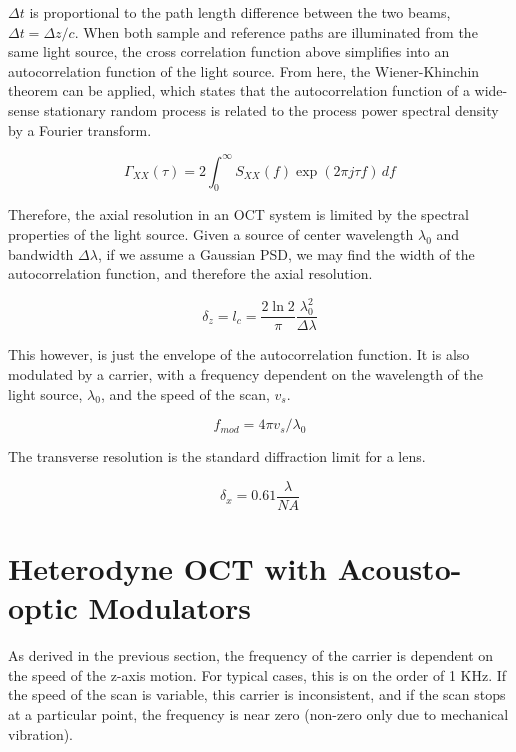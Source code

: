 $\Delta t$ is proportional to the path length difference between the two beams, $\Delta t = \Delta z / c$. When both sample and reference paths are illuminated from the same light source, the cross correlation function above simplifies into an autocorrelation function of the light source. From here, the Wiener-Khinchin theorem can be applied, which states that the autocorrelation function of a wide-sense stationary random process is related to the process power spectral density by a Fourier transform.

\begin{equation}
\Gamma_{XX}(\tau) = 2 \int_{0}^\infty S_{XX}(f) \exp(2 \pi j \tau f) \,df
\end{equation}

Therefore, the axial resolution in an OCT system is limited by the spectral properties of the light source. Given a source of center wavelength $\lambda_0$ and bandwidth $\Delta \lambda$, if we assume a Gaussian PSD, we may find the width of the autocorrelation function, and therefore the axial resolution. \cite{fercher}

\begin{equation} \label{eq:ares}
\delta_z = l_c = \frac{2 \ln{2}}{\pi} \frac{\lambda_0^2}{\Delta \lambda}
\end{equation}

This however, is just the envelope of the autocorrelation function. It is also modulated by a carrier, with a  frequency dependent on the wavelength of the light source, $\lambda_0$, and the speed of the scan, $v_s$. \cite{fercher}

\begin{equation} \label{eq:carrier}
f_{mod} = 4 \pi v_s / \lambda_0
\end{equation}

The transverse resolution is the standard diffraction limit for a lens. \cite{hecht}

\begin{equation} \label{eq:tres}
\delta_x = 0.61 \frac{\lambda}{NA}
\end{equation}

\section{Heterodyne OCT with Acousto-optic Modulators}

As derived in the previous section, the frequency of the carrier is dependent on the speed of the z-axis motion. For typical cases, this is on the order of 1 KHz. If the speed of the scan is variable, this carrier is inconsistent, and if the scan stops at a particular point, the frequency is near zero (non-zero only due to mechanical vibration).

